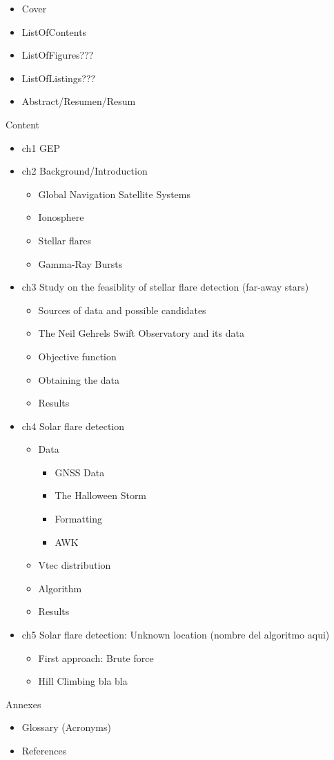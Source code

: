 \begin{itemize}
	\item Cover
	\item ListOfContents
	\item ListOfFigures???
	\item ListOfListings???
	\item Abstract/Resumen/Resum
\end{itemize} 

Content

\begin{itemize}
	\item ch1 GEP
	\item ch2 Background/Introduction
	\begin{itemize}
		\item Global Navigation Satellite Systems
		\item Ionosphere
		\item Stellar flares
		\item  Gamma-Ray Bursts
	\end{itemize}
	\item ch3 Study on the feasiblity of stellar flare detection (far-away stars)
	\begin{itemize}
		\item Sources of data and possible candidates
		\item The Neil Gehrels Swift Observatory and its data 
		\item Objective function
		\item Obtaining the data
		\item Results
	\end{itemize}
	\item ch4 Solar flare detection
	\begin{itemize}
		\item Data
		\begin{itemize}
			\item GNSS Data
			\item The Halloween Storm
			\item Formatting
			\item AWK
		\end{itemize}
		\item Vtec distribution
		\item Algorithm
		\item Results
	\end{itemize}
	\item ch5 Solar flare detection: Unknown location (nombre del algoritmo aqui)
	\begin{itemize}
		\item First approach: Brute force
		\item Hill Climbing bla bla
	\end{itemize}
\end{itemize}

Annexes

\begin{itemize}
	\item Glossary (Acronyms)
	\item References
\end{itemize}



